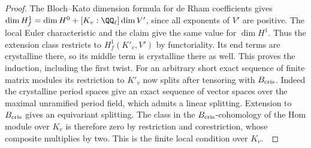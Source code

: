 \documentclass[a4paper,11pt]{article}
\theoremstyle{definition}
\theoremstyle{remark}
\numberwithin{equation}{section}
\begin{document}
\begin{proof}
The Bloch--Kato dimension formula for de Rham coefficients
gives \(\dim H_f^1=\dim H^0+[K_v:\QQ_\ell]\dim V'\),
since all exponents of \(V'\) are positive. The local Euler
characteristic and the claim give the same value for
\(\dim H^1\). Thus the extension class restricts to
\(H_f^1(K'_v,V')\) by functoriality. Its end terms are
crystalline there, so its middle term is crystalline there
as well. This proves the induction, including the first
twist. For an arbitrary short exact sequence of finite
matrix modules its restriction to \(K'_v\) now splits after
tensoring with \(B_{\rm cris}\). Indeed the crystalline
period spaces give an exact sequence of vector spaces over
the maximal unramified period field, which admits a linear
splitting. Extension to \(B_{\rm cris}\) gives an equivariant
splitting. The class in the \(B_{\rm cris}\)-cohomology of
the Hom module over \(K_v\) is therefore zero by restriction
and corestriction, whose composite multiplies by two.
This is the finite local condition over \(K_v\).~\cite{XI-VIII-VI-bk117}
\end{proof}
\end{document}
